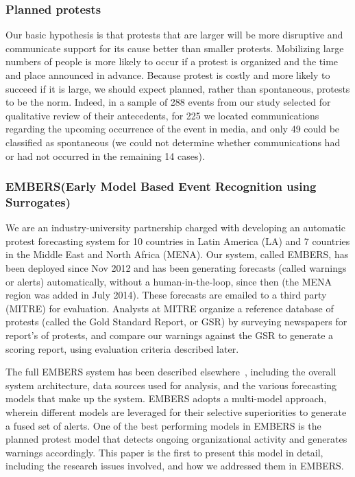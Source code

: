 \subsubsection{Planned protests}
Our basic hypothesis is that protests that are larger will be more
disruptive and communicate support for its cause better than smaller
protests.  Mobilizing large numbers of people is more likely to occur if
a protest is organized and the time and place announced in advance.
Because protest is costly and more likely to succeed if it is large, we
should expect planned, rather than spontaneous, protests to be the norm.
Indeed, in a sample of 288 events from our study selected for
qualitative review of their antecedents, for 225 we located
communications regarding the upcoming occurrence of the event in media,
and only 49 could be classified as spontaneous (we could not determine
whether communications had or had not occurred in the remaining 14
cases).

\subsubsection{EMBERS(Early Model Based Event Recognition using
Surrogates)}
We are an industry-university partnership charged with developing an
automatic protest forecasting system for 10 countries in
Latin America (LA) and 7 countries in the Middle East and North
Africa (MENA). Our system, called EMBERS, has been
deployed since Nov 2012 and has been generating forecasts (called
warnings or alerts) automatically, without a human-in-the-loop, since then (the MENA region was added in July 2014). These forecasts are emailed to
a third party (MITRE) for evaluation. Analysts at MITRE organize a reference
database of protests (called the Gold Standard Report,
or GSR) by surveying newspapers for report's of protests, and
compare our warnings against the GSR to generate a scoring report, using evaluation
criteria described later.

The full EMBERS system has been described elsewhere~\cite{emberskdd,DBLP:conf/bigdataconf/DoyleKSAZLMZLBKFR14}, including
the overall system architecture, data sources used for analysis, and the
various forecasting models that make up the system. EMBERS adopts a multi-model approach,
wherein different models are leveraged for their selective superiorities
to generate a fused set of alerts. One of the
best performing models in EMBERS is the planned protest model that detects
ongoing organizational activity and generates warnings accordingly. This paper
is the first to present this model in detail, including the 
research issues involved, and how we addressed them in EMBERS.


